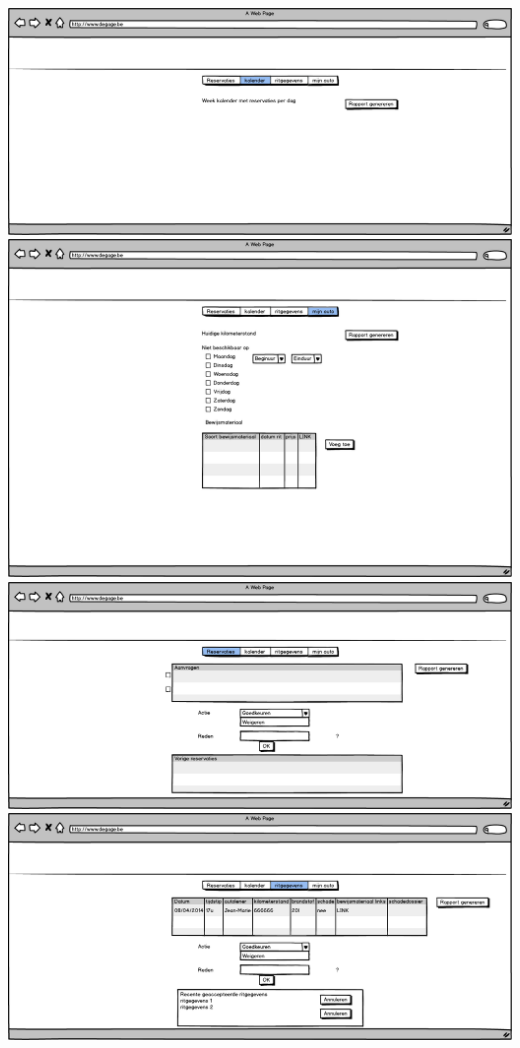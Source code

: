 \documentclass[]{article}
\begin{document}
\includegraphics[scale=0.4]{mockups/autobeheer_kalender.png}
\includegraphics[scale=0.4]{mockups/autobeheer_mijnauto.png}
\includegraphics[scale=0.4]{mockups/autobeheer_reservaties.png}
\includegraphics[scale=0.4]{mockups/autobeheer_ritgegevens.png}
\end{document}
